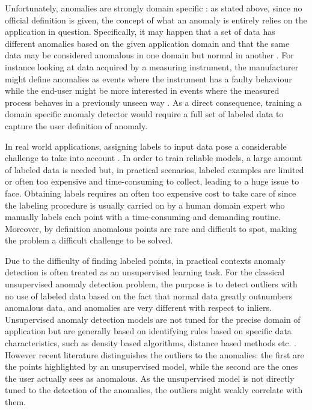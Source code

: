 Unfortunately, anomalies are strongly domain specific \cite{foorthuis2021nature}: as stated above, since no official definition is given, the concept of what an anomaly is entirely relies on the application in question. Specifically, it may happen that a set of data has different anomalies based on the given application domain and that the same data may be considered anomalous in one domain but normal in another \cite{sejr2021explainable}. For instance looking at data acquired by a measuring instrument, the manufacturer might define anomalies as events where the instrument has a faulty behaviour while the end-user might be more interested in events where the measured process behaves in a previously unseen way \cite{barbariol2020self}. As a direct consequence, training a domain specific anomaly detector would require a full set of labeled data to capture the user definition of anomaly. 

In real world applications, assigning labels to input data pose a considerable challenge to take into account \cite{zhu2009introduction}. In order to train reliable models, a large amount of labeled data is needed but, in practical scenarios, labeled examples are limited or often too expensive and time-consuming to collect, leading to a huge issue to face. Obtaining labels requires an often too expensive cost to take care of since the labeling procedure is usually carried on by a human domain expert who manually labels each point with a time-consuming and demanding routine. Moreover, by definition anomalous points are rare and difficult to spot, making the problem a difficult challenge to be solved. 

Due to the difficulty of finding labeled points, in practical contexts anomaly detection is often treated as an unsupervised learning task. For the classical unsupervised anomaly detection problem, the purpose is to detect outliers with no use of labeled data based on the fact that normal data greatly outnumbers anomalous data, and anomalies are very different with respect to inliers. Unsupervised anomaly detection models are not tuned for the precise domain of application but are generally based on identifying rules based on specific data characteristics, such as density based algorithms, distance based methods etc. \cite{hochenbaum2017automatic, hill2010anomaly, knorr1998algorithms, breunig2000lof}. 
However recent literature \cite{das2016incorporating,sejr2021explainable} distinguishes the outliers to the anomalies: the first are the points highlighted by an unsupervised model, while the second are the ones the user actually sees as anomalous. As the unsupervised model is not directly tuned to the detection of the anomalies, the outliers might weakly correlate with them. 

